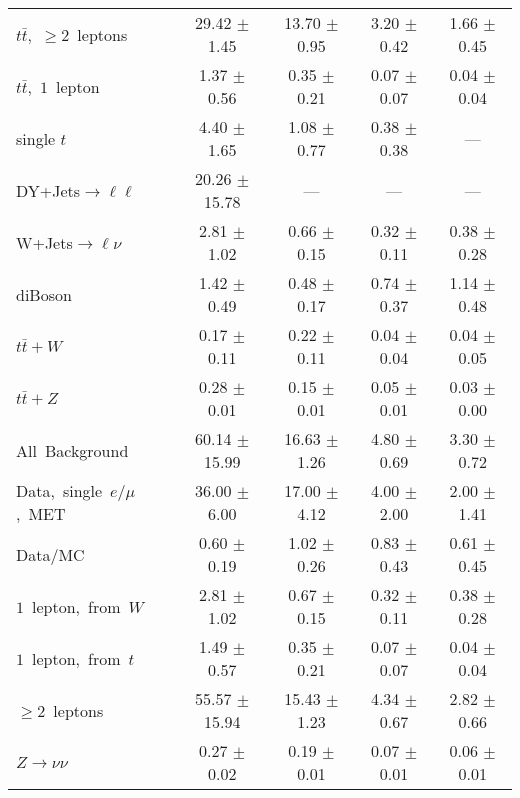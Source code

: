 \documentclass{article}
\begin{document}
\begin{longtable}{|l|c|c|c|c|}
$t\bar{t}$,~$\ge2$~leptons & 29.42 $\pm$ 1.45  & 13.70 $\pm$ 0.95  & 3.20 $\pm$ 0.42  & 1.66 $\pm$ 0.45 \\* 
$t\bar{t}$,~$1$~lepton & 1.37 $\pm$ 0.56  & 0.35 $\pm$ 0.21  & 0.07 $\pm$ 0.07  & 0.04 $\pm$ 0.04 \\* 
single $t$  & 4.40 $\pm$ 1.65  & 1.08 $\pm$ 0.77  & 0.38 $\pm$ 0.38  & --- \\* 
DY+Jets$\rightarrow\ell\ell$  & 20.26 $\pm$ 15.78  & ---  & ---  & --- \\* 
W+Jets$\rightarrow\ell\nu$  & 2.81 $\pm$ 1.02  & 0.66 $\pm$ 0.15  & 0.32 $\pm$ 0.11  & 0.38 $\pm$ 0.28 \\* 
diBoson  & 1.42 $\pm$ 0.49  & 0.48 $\pm$ 0.17  & 0.74 $\pm$ 0.37  & 1.14 $\pm$ 0.48 \\* 
$t\bar{t}+W$  & 0.17 $\pm$ 0.11  & 0.22 $\pm$ 0.11  & 0.04 $\pm$ 0.04  & 0.04 $\pm$ 0.05 \\* 
$t\bar{t}+Z$  & 0.28 $\pm$ 0.01  & 0.15 $\pm$ 0.01  & 0.05 $\pm$ 0.01  & 0.03 $\pm$ 0.00 \\* 
\hline \hline 
All~Background  & 60.14 $\pm$ 15.99  & 16.63 $\pm$ 1.26  & 4.80 $\pm$ 0.69  & 3.30 $\pm$ 0.72 \\* 
Data,~single~$e/\mu$,~MET  & 36.00 $\pm$ 6.00  & 17.00 $\pm$ 4.12  & 4.00 $\pm$ 2.00  & 2.00 $\pm$ 1.41 \\* 
Data/MC  & 0.60 $\pm$ 0.19  & 1.02 $\pm$ 0.26  & 0.83 $\pm$ 0.43  & 0.61 $\pm$ 0.45 \\* 
\hline \hline 
$1$~lepton,~from~$W$  & 2.81 $\pm$ 1.02  & 0.67 $\pm$ 0.15  & 0.32 $\pm$ 0.11  & 0.38 $\pm$ 0.28 \\* 
$1$~lepton,~from~$t$  & 1.49 $\pm$ 0.57  & 0.35 $\pm$ 0.21  & 0.07 $\pm$ 0.07  & 0.04 $\pm$ 0.04 \\* 
$\ge2$~leptons  & 55.57 $\pm$ 15.94  & 15.43 $\pm$ 1.23  & 4.34 $\pm$ 0.67  & 2.82 $\pm$ 0.66 \\* 
$Z\rightarrow\nu\nu$  & 0.27 $\pm$ 0.02  & 0.19 $\pm$ 0.01  & 0.07 $\pm$ 0.01  & 0.06 $\pm$ 0.01 \\* 
\hline 
\end{longtable} 

 
 
 
 
\pagebreak 

 
 
 
 
\end{document}
